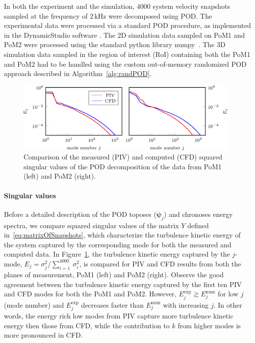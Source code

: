 In both the experiment and the simulation, $4000$ system velocity snapshots sampled at the frequency of $2\,\mathrm{kHz}$ were decomposed using POD. The experimental data were processed via a standard POD procedure{, as} implemented in the DynamicStudio software \cite{dynamicsStudio}. The 2D simulation data {sampled on PoM1 and PoM2} were processed using {the} standard python library numpy~\cite{numpy}. {The} 3D simulation data {sampled in the region of interest {(RoI)} containing both the PoM1 and PoM2} had to be handled using {the custom} {out-of-memory} randomized POD approach described in Algorithm~\ref{alg:randPOD}.

\begin{figure}[htbp]
    \centering
    \includegraphics[width=0.98\textwidth]{02_images/00_export/figure9.png}
    \caption{Comparison of the measured (PIV) and computed (CFD) squared singular values of the POD decomposition of the data from PoM1 (left) and PoM2 (right).}
    \label{fig:singVals}
\end{figure}

\paragraph{Singular values}
Before a detailed description of the POD toposes {($\bm{\psi}_{j}$)} and chronoses {energy} spectra, we compare squared singular values of the matrix $Y$ defined in~\eqref{eq:matrixOfSnapshots}, which characterize the turbulence kinetic energy of the system captured by {the} corresponding mode for both the measured and computed data. In Figure~\ref{fig:singVals}, the turbulence kinetic energy captured by {the} $j$-mode, {$E_j = \sigma^2_j/\sum_{i=1}^{4000}\,\sigma^2_i$}, is compared for PIV and CFD results from both {the} planes of measurement{,} PoM1 (left) and PoM2 (right). Observe the good agreement between the turbulence kinetic energy captured by the first ten PIV and CFD modes {for both the PoM1 and PoM2}. However, $E_{j}^{\mathrm{exp}} \gtrsim E_{j}^{\mathrm{num}}$ for low $j$ (mode number) and $E_{j}^{\mathrm{exp}}$ decreases faster than $E_{j}^{\mathrm{num}}$ with increasing $j$. In other words, the energy rich low modes from PIV capture more turbulence kinetic energy then those from CFD, while the contribution to $k$ from higher modes is more pronounced in CFD.

